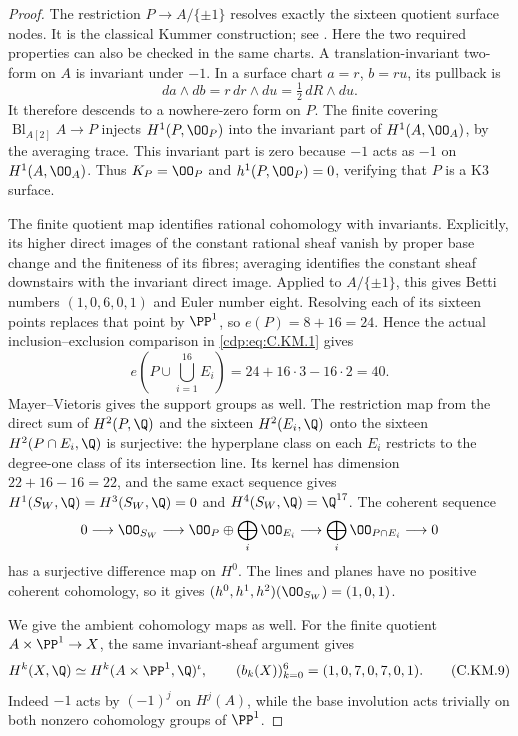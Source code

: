 \begin{proof}
The restriction $P\to A/\{\pm1\}$ resolves exactly the
sixteen quotient surface nodes. It is the classical Kummer
construction; see \cite[Chapter~1, Example~1.3(iii)]{HuybrechtsK3Draft}.
Here the two required properties can also be checked in the
same charts. A translation-invariant two-form on $A$ is
invariant under $-1$. In a surface chart $a=r$, $b=ru$,
its pullback is
\[
                da\wedge db=r\,dr\wedge du
                            =\tfrac12\,dR\wedge du.   \tag{C.KM.7}\label{cdp:eq:C.KM.7}
\]
It therefore descends to a nowhere-zero form on $P$.
The finite covering $\operatorname{Bl}_{A[2]}A\to P$
injects $H^1(P,\OO_P)$ into the invariant part of
$H^1(A,\OO_A)$, by the averaging trace. This invariant
part is zero because $-1$ acts as $-1$ on $H^1(A,\OO_A)$.
Thus $K_P=\OO_P$ and $h^1(P,\OO_P)=0$, verifying that
$P$ is a K3 surface.

The finite quotient map identifies rational cohomology with
invariants. Explicitly, its higher direct images of the
constant rational sheaf vanish by proper base change and
the finiteness of its fibres; averaging identifies the
constant sheaf downstairs with the invariant direct image.
Applied to $A/\{\pm1\}$, this gives Betti numbers
$(1,0,6,0,1)$ and Euler number eight. Resolving each of its
sixteen points replaces that point by $\PP^1$, so
$e(P)=8+16=24$. Hence the actual inclusion--exclusion
comparison in \eqref{cdp:eq:C.KM.1} gives
\[
          e\left(P\cup\bigcup_{i=1}^{16}E_i\right)
                    =24+16\cdot3-16\cdot2=40.          \tag{C.KM.8}\label{cdp:eq:C.KM.8}
\]
Mayer--Vietoris gives the support groups as well. The restriction
map from the direct sum of $H^2(P,\Q)$ and the sixteen
$H^2(E_i,\Q)$ onto the sixteen $H^2(P\cap E_i,\Q)$ is
surjective: the hyperplane class on each $E_i$ restricts to
the degree-one class of its intersection line. Its kernel
has dimension $22+16-16=22$, and the same exact sequence
gives $H^1(S_W,\Q)=H^3(S_W,\Q)=0$ and
$H^4(S_W,\Q)=\Q^{17}$. The coherent sequence
\[
 0\longrightarrow\OO_{S_W}\longrightarrow
 \OO_P\oplus\bigoplus_i\OO_{E_i}
 \longrightarrow\bigoplus_i\OO_{P\cap E_i}
 \longrightarrow0
\]
has a surjective difference map on $H^0$. The lines and planes
have no positive coherent cohomology, so it gives
$(h^0,h^1,h^2)(\OO_{S_W})=(1,0,1)$.

We give the ambient cohomology maps as well. For the finite
quotient $A\times\PP^1\to X$, the same invariant-sheaf
argument gives
\[
 H^k(X,\Q)\simeq H^k(A\times\PP^1,\Q)^{\iota},
 \qquad (b_k(X))_{k=0}^6=(1,0,7,0,7,0,1).              \tag{C.KM.9}\label{cdp:eq:C.KM.9}
\]
Indeed $-1$ acts by $(-1)^j$ on $H^j(A)$, while the
base involution acts trivially on both nonzero cohomology
groups of $\PP^1$.


\end{proof}
